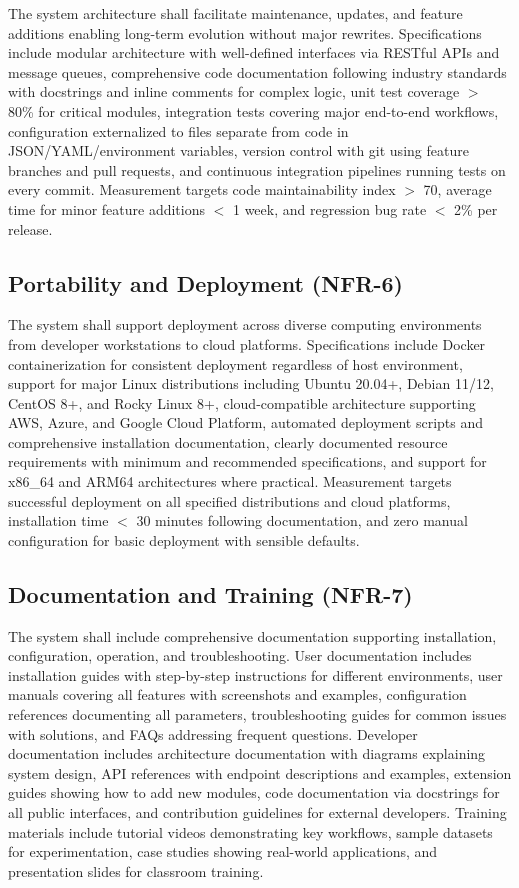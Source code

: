 The system architecture shall facilitate maintenance, updates, and feature additions enabling long-term evolution without major rewrites. Specifications include modular architecture with well-defined interfaces via RESTful APIs and message queues, comprehensive code documentation following industry standards with docstrings and inline comments for complex logic, unit test coverage $>$ 80\% for critical modules, integration tests covering major end-to-end workflows, configuration externalized to files separate from code in JSON/YAML/environment variables, version control with git using feature branches and pull requests, and continuous integration pipelines running tests on every commit. Measurement targets code maintainability index $>$ 70, average time for minor feature additions $<$ 1 week, and regression bug rate $<$ 2\% per release.

\subsection{Portability and Deployment (NFR-6)}

The system shall support deployment across diverse computing environments from developer workstations to cloud platforms. Specifications include Docker containerization for consistent deployment regardless of host environment, support for major Linux distributions including Ubuntu 20.04+, Debian 11/12, CentOS 8+, and Rocky Linux 8+, cloud-compatible architecture supporting AWS, Azure, and Google Cloud Platform, automated deployment scripts and comprehensive installation documentation, clearly documented resource requirements with minimum and recommended specifications, and support for x86\_64 and ARM64 architectures where practical. Measurement targets successful deployment on all specified distributions and cloud platforms, installation time $<$ 30 minutes following documentation, and zero manual configuration for basic deployment with sensible defaults.

\subsection{Documentation and Training (NFR-7)}

The system shall include comprehensive documentation supporting installation, configuration, operation, and troubleshooting. User documentation includes installation guides with step-by-step instructions for different environments, user manuals covering all features with screenshots and examples, configuration references documenting all parameters, troubleshooting guides for common issues with solutions, and FAQs addressing frequent questions. Developer documentation includes architecture documentation with diagrams explaining system design, API references with endpoint descriptions and examples, extension guides showing how to add new modules, code documentation via docstrings for all public interfaces, and contribution guidelines for external developers. Training materials include tutorial videos demonstrating key workflows, sample datasets for experimentation, case studies showing real-world applications, and presentation slides for classroom training. 

